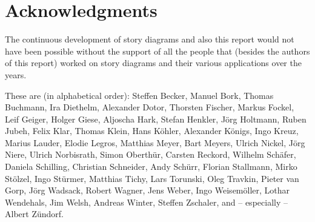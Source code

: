 \section*{Acknowledgments}

The continuous development of story diagrams and also this report would not have been possible without the support
of all the people that (besides the authors of this report) worked on story diagrams and their various applications over the years.

These are (in alphabetical order): 
Steffen Becker, Manuel Bork, Thomas Buchmann, 
Ira Diethelm, Alexander Dotor, 
Thorsten Fischer, Markus Fockel,
Leif Geiger, Holger Giese, 
Aljoscha Hark, Stefan Henkler, J\"{o}rg Holtmann,
Ruben Jubeh,
Felix Klar, Thomas Klein, Hans K\"{o}hler, Alexander K\"{o}nigs, Ingo Kreuz, 
Marius Lauder, Elodie Legros,
Matthias Meyer, Bart Meyers, 
Ulrich Nickel, J\"{o}rg Niere, Ulrich Norbisrath,
Simon Oberth\"{u}r, 
Carsten Reckord, 
Wilhelm Sch\"{a}fer, Daniela Schilling, Christian Schneider, Andy Sch\"{u}rr, Florian Stallmann, Mirko St\"{o}lzel, Ingo St\"{u}rmer, 
Matthias Tichy, Lars Torunski, Oleg Travkin, 
Pieter van Gorp, 
J\"{o}rg Wadsack, Robert Wagner, Jens Weber, Ingo Weisem\"{o}ller, Lothar Wendehals, Jim Welsh, Andreas Winter, 
Steffen Zschaler, and -- especially -- Albert Z\"{u}ndorf.

